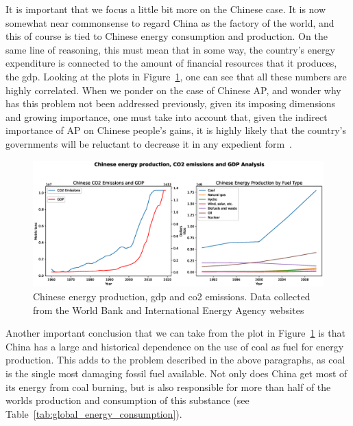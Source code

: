 It is important that we focus a little bit more on the Chinese case. It
is now somewhat near commonsense to regard China as the factory of the
world, and this of course is tied to Chinese energy consumption and
production. On the same line of reasoning, this must mean that in some
way, the country's energy expenditure is connected to the amount of
financial resources that it produces, the \gls{gdp}. Looking at the
plots in Figure~\ref{fig:china_energy}, one can see that all these
numbers are highly correlated. When we ponder on the case of Chinese
\gls{AP}, and wonder why has this problem not been addressed previously,
given its imposing dimensions and growing importance, one must take into
account that, given the indirect importance of \gls{AP} on Chinese
people's gains, it is highly likely that the country's governments will
be reluctant to decrease it in any expedient form~\cite{CABI2019, IEA,
WorldBank}.

\begin{figure}[htpb]
    \centering
    \includegraphics[width=\linewidth]{img/eps/energy_co2_gdp.eps}
    \caption{Chinese energy production, \gls{gdp} and \gls{co2}
    emissions.  Data collected from the World Bank and International
    Energy Agency websites~\cite{WorldBank, IEA}}
    \label{fig:china_energy}
\end{figure}

Another important conclusion that we can take from the plot in
Figure~\ref{fig:china_energy} is that China has a large and historical
dependence on the use of coal as fuel for energy production. This adds
to the problem described in the above paragraphs, as coal is the single
most damaging fossil fuel available. Not only does China get most of its
energy from coal burning, but is also responsible for more than half of
the worlds production and consumption of this substance (see
Table~\ref{tab:global_energy_consumption}).


